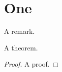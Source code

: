 \documentclass{siamltex}
\begin{document}
\section{One}
\begin{remark}A remark.\end{remark}
\begin{theorem}A theorem.\end{theorem}
\begin{proof}A proof.\end{proof}
\end{document}
